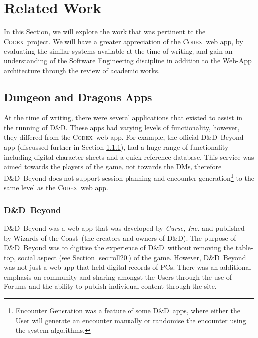 \documentclass[final]{cmpreport}
\newcommand{\WotC}{Wizards of the Coast}
\newcommand{\dnd}{D\&D}
\newcommand{\Codex}{\textsc{Codex}}
\begin{document}
	\section{Related Work} \label{sec:related}
	In this Section, we will explore the work that was pertinent to the \Codex \ project. We will have a greater appreciation of the \Codex \ web app, by evaluating the similar systems available at the time of writing, and gain an understanding of the Software Engineering discipline in addition to the Web-App architecture through the review of academic works.
	
		\subsection{Dungeon and Dragons Apps} \label{sec:other-dnd-apps}
		At the time of writing, there were several applications that existed to assist in the running of \dnd. These apps had varying levels of functionality, however, they differed from the \Codex \ web app. For example, the official \dnd \ Beyond app \citep{dnd-beyond} (discussed further in Section \ref{sec:dnd-beyond}), had a huge range of functionality including digital character sheets and a quick reference database. This service was aimed towards the players of the game, not towards the DMs, therefore \dnd \ Beyond does not support session planning and encounter generation\footnote{Encounter Generation was a feature of some \dnd \ apps, where either the User will generate an encounter manually or randomise the encounter using the system algorithms.} to the same level as the \Codex \ web app.
		
			\subsubsection{\dnd \ Beyond} \label{sec:dnd-beyond}
			\dnd \ Beyond was a web app that was developed by \emph{Curse, Inc.} and published by \WotC \ (the creators and owners of \dnd). The purpose of \dnd \ Beyond was to digitise the experience of \dnd \ without removing the table-top, social aspect (see Section \ref{sec:roll20}) of the game. However, \dnd \ Beyond was not just a web-app that held digital records of PCs. There was an additional emphasis on community and sharing amongst the Users through the use of Forums and the ability to publish individual content through the site. 
			
\end{document}
